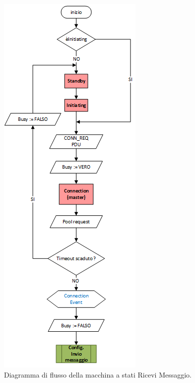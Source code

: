 \begin{figure}[!h]
	\centering
	\includegraphics[height= 0.78\textheight]{Images/diagrammi_fsa/Ricevi_msg_fsa}
	\caption[Ricevi Messaggio fsa]{Diagramma di flusso della macchina a stati Ricevi Messaggio.}
	\label{fig:Ricevi_msg_fsa}
\end{figure}

